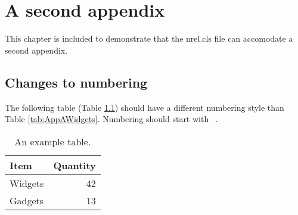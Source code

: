 \chapter{A second appendix}
This chapter is included to demonstrate that the nrel.cls file can accomodate a second appendix.

\section{Changes to numbering}
The following table (Table \ref{tab:AppBWidgets}) should have a different numbering style than Table \ref{tab:AppAWidgets}. Numbering should start with \thechapter\ .

\begin{table}[!h]
\centering
\caption{An example table.}\label{tab:AppBWidgets}
\begin{tabular}{lr}
Item & Quantity \\
\hline
Widgets & 42 \\
Gadgets & 13
\end{tabular}
\end{table}
